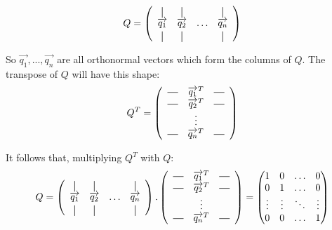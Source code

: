 \documentclass[a4,12pt,twosided,openany]{memoir}
\begin{document}
\[
Q = 
\left(
  \begin{array}{cccc}
    \vertbar & \vertbar &        & \vertbar \\
    \overrightarrow{q_{1}}    & \overrightarrow{q_{2}}    & \ldots & \overrightarrow{q_{n}}    \\
    \vertbar & \vertbar &        & \vertbar 
  \end{array}
\right)
\]
\par 
\indent
So $\overrightarrow{q_{1}},...,\overrightarrow{q_{n}}$ are all orthonormal vectors which form the columns of $Q$. The transpose of $Q$ will have this shape:
\setlength{\extrarowheight}{1ex}
\[
Q^T =
\left(
  \begin{array}{ccc}
    \horzbar & \overrightarrow{q_{1}}^T & \horzbar \\
    \horzbar & \overrightarrow{q_{2}}^T & \horzbar \\
             & \vdots    &          \\
    \horzbar & \overrightarrow{q_{n}}^T & \horzbar
  \end{array}
\right)
\]
\par 
\indent
It follows that, multiplying $Q^T$ with $Q$:
\[
Q = 
\left(
  \begin{array}{cccc}
    \vertbar & \vertbar &        & \vertbar \\
    \overrightarrow{q_{1}}    & \overrightarrow{q_{2}}    & \ldots & \overrightarrow{q_{n}}    \\
    \vertbar & \vertbar &        & \vertbar 
  \end{array}
\right).
\left(
  \begin{array}{ccc}
    \horzbar & \overrightarrow{q_{1}}^T & \horzbar \\
    \horzbar & \overrightarrow{q_{2}}^T & \horzbar \\
             & \vdots    &          \\
    \horzbar & \overrightarrow{q_{n}}^T & \horzbar
  \end{array}
\right) = 
\begin{pmatrix}
1 & 0 & \hdots & 0 \\
0 & 1 & \hdots & 0 \\
\vdots & \vdots & \ddots & \vdots \\
0 & 0 & \hdots & 1 
\end{pmatrix}
\]
\par 
\indent
\end{document}
